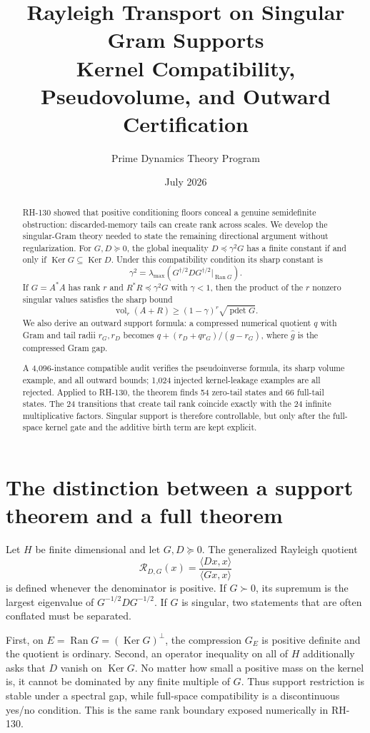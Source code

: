 \documentclass[12pt]{article}
\title{Rayleigh Transport on Singular Gram Supports\\\large Kernel Compatibility, Pseudovolume, and Outward Certification}
\author{Prime Dynamics Theory Program}
\date{July 2026}
\newcommand{\Ker}{\operatorname{Ker}}
\newcommand{\Ran}{\operatorname{Ran}}
\newcommand{\pdet}{\operatorname{pdet}}
\begin{document}
\maketitle

\begin{abstract}
RH-130 showed that positive conditioning floors conceal a genuine
semidefinite obstruction: discarded-memory tails can create rank across
scales.  We develop the singular-Gram theory needed to state the remaining
directional argument without regularization.  For $G,D\succeq0$, the global
inequality $D\preceq\gamma^2G$ has a finite constant if and only if
$\Ker G\subseteq\Ker D$.  Under this compatibility condition its sharp
constant is
\[
 \gamma^2=\lambda_{\max}(G^{\dagger/2}DG^{\dagger/2}\big|_{\Ran G}).
\]
If $G=A^*A$ has rank $r$ and $R^*R\preceq\gamma^2G$ with $\gamma<1$,
then the product of the $r$ nonzero singular values satisfies the sharp
bound
\[
 \operatorname{vol}_r(A+R)\geq
 (1-\gamma)^r\sqrt{\pdet G}.
\]
We also derive an outward support formula: a compressed numerical quotient
$q$ with Gram and tail radii $r_G,r_D$ becomes
$q+(r_D+qr_G)/(\widehat g-r_G)$, where $\widehat g$ is the compressed Gram
gap.

A 4,096-instance compatible audit verifies the pseudoinverse formula, its
sharp volume example, and all outward bounds; 1,024 injected kernel-leakage
examples are all rejected.  Applied to RH-130, the theorem finds 54 zero-tail
states and 66 full-tail states.  The 24 transitions that create tail rank
coincide exactly with the 24 infinite multiplicative factors.  Singular
support is therefore controllable, but only after the full-space kernel gate
and the additive birth term are kept explicit.
\end{abstract}

\section{The distinction between a support theorem and a full theorem}
Let $H$ be finite dimensional and let $G,D\succeq0$.  The generalized
Rayleigh quotient
\[
 \mathcal R_{D,G}(x)=\frac{\langle Dx,x\rangle}{\langle Gx,x\rangle}
\]
is defined whenever the denominator is positive.  If $G\succ0$, its
supremum is the largest eigenvalue of $G^{-1/2}DG^{-1/2}$.  If $G$ is
singular, two statements that are often conflated must be separated.

First, on $E=\Ran G=(\Ker G)^\perp$, the compression $G_E$ is positive
definite and the quotient is ordinary.  Second, an operator inequality on
all of $H$ additionally asks that $D$ vanish on $\Ker G$.  No matter how
small a positive mass on the kernel is, it cannot be dominated by any
finite multiple of $G$.  Thus support restriction is stable under a spectral
gap, while full-space compatibility is a discontinuous yes/no condition.
This is the same rank boundary exposed numerically in RH-130.
\end{document}
